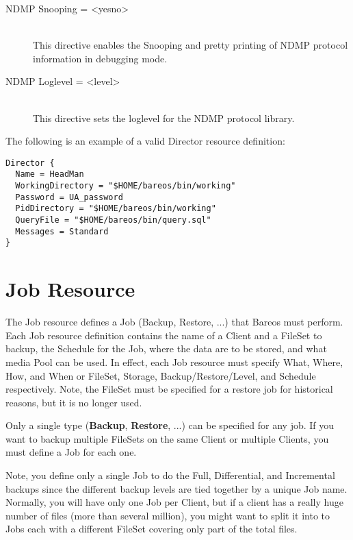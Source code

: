 \begin{description}
\item [NDMP Snooping = {\textless}yes{\textbar}no{\textgreater}] \hfill \\
This directive enables the Snooping and pretty printing of NDMP protocol
information in debugging mode.

\item [NDMP Loglevel = {\textless}level{\textgreater}] \hfill \\
This directive sets the loglevel for the NDMP protocol library.
\end{description}

The following is an example of a valid Director resource definition:

\footnotesize
\begin{verbatim}
Director {
  Name = HeadMan
  WorkingDirectory = "$HOME/bareos/bin/working"
  Password = UA_password
  PidDirectory = "$HOME/bareos/bin/working"
  QueryFile = "$HOME/bareos/bin/query.sql"
  Messages = Standard
}
\end{verbatim}
\normalsize

\section{Job Resource}
\label{JobResource}

The Job resource defines a Job (Backup, Restore, ...) that Bareos must
perform. Each Job resource definition contains the name of a Client and
a FileSet to backup, the Schedule for the Job, where the data
are to be stored, and what media Pool can be used. In effect, each Job
resource must specify What, Where, How, and When or FileSet, Storage,
Backup/Restore/Level, and Schedule respectively. Note, the FileSet must
be specified for a restore job for historical reasons, but it is no longer used.

Only a single type ({\bf Backup}, {\bf Restore}, ...) can be specified for any
job. If you want to backup multiple FileSets on the same Client or multiple
Clients, you must define a Job for each one.

Note, you define only a single Job to do the Full, Differential, and
Incremental backups since the different backup levels are tied together by
a unique Job name.  Normally, you will have only one Job per Client, but
if a client has a really huge number of files (more than several million),
you might want to split it into to Jobs each with a different FileSet
covering only part of the total files.


